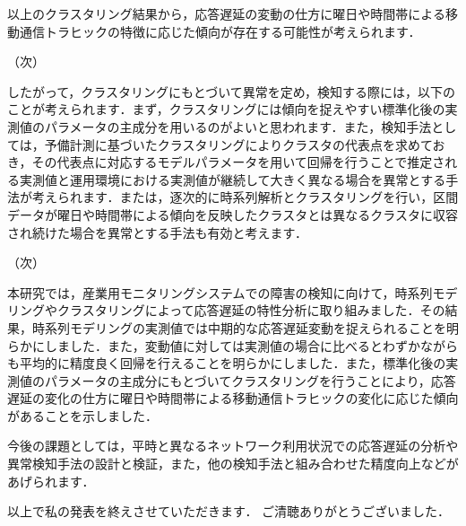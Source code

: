 \documentclass[a4j]{jarticle}
\begin{document}
以上のクラスタリング結果から，応答遅延の変動の仕方に曜日や時間帯による移動通信トラヒックの特徴に応じた傾向が存在する可能性が考えられます．

（次）

したがって，クラスタリングにもとづいて異常を定め，検知する際には，以下のことが考えられます．まず，クラスタリングには傾向を捉えやすい標準化後の実測値のパラメータの主成分を用いるのがよいと思われます．また，検知手法としては，予備計測に基づいたクラスタリングによりクラスタの代表点を求めておき，その代表点に対応するモデルパラメータを用いて回帰を行うことで推定される実測値と運用環境における実測値が継続して大きく異なる場合を異常とする手法が考えられます．または，逐次的に時系列解析とクラスタリングを行い，区間データが曜日や時間帯による傾向を反映したクラスタとは異なるクラスタに収容され続けた場合を異常とする手法も有効と考えます．

（次）

本研究では，産業用モニタリングシステムでの障害の検知に向けて，時系列モデリングやクラスタリングによって応答遅延の特性分析に取り組みました．その結果，時系列モデリングの実測値では中期的な応答遅延変動を捉えられることを明らかにしました．また，変動値に対しては実測値の場合に比べるとわずかながらも平均的に精度良く回帰を行えることを明らかにしました．また，標準化後の実測値のパラメータの主成分にもとづいてクラスタリングを行うことにより，応答遅延の変化の仕方に曜日や時間帯による移動通信トラヒックの変化に応じた傾向があることを示しました．

今後の課題としては，平時と異なるネットワーク利用状況での応答遅延の分析や異常検知手法の設計と検証，また，他の検知手法と組み合わせた精度向上などがあげられます．

以上で私の発表を終えさせていただきます．
ご清聴ありがとうございました．
\end{document}

